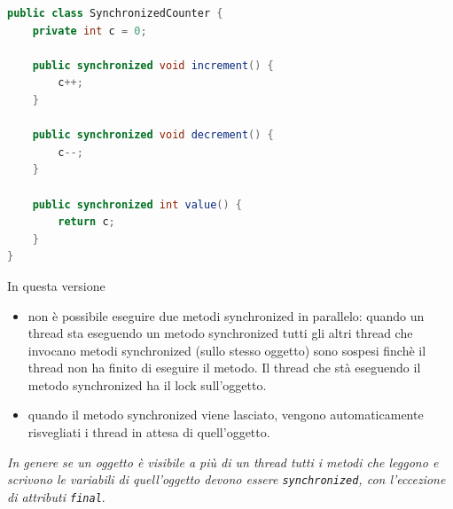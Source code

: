 \documentclass{article}
\begin{document}
\begin{lstlisting}[language=Java]
public class SynchronizedCounter {
    private int c = 0;

    public synchronized void increment() {
        c++;
    }

    public synchronized void decrement() {
        c--;
    }

    public synchronized int value() {
        return c;
    }
}
\end{lstlisting}
In questa versione 
\begin{itemize}
\item non \`e possibile eseguire due metodi synchronized in parallelo: quando un thread sta eseguendo un metodo synchronized tutti gli altri thread che invocano metodi synchronized (sullo stesso oggetto) sono sospesi finch\`e il thread non ha finito di eseguire il  metodo. Il thread che st\`a eseguendo il metodo synchronized ha il lock sull'oggetto.
\item quando il metodo synchronized viene lasciato, vengono automaticamente risvegliati i thread in attesa di quell'oggetto. 
\end{itemize}
\emph{In genere se un oggetto \`e visibile a pi\`u di un thread tutti i metodi che leggono e scrivono le variabili di quell'oggetto devono essere \texttt{synchronized}, con l'eccezione di attributi \texttt{final}}.
\end{document}
